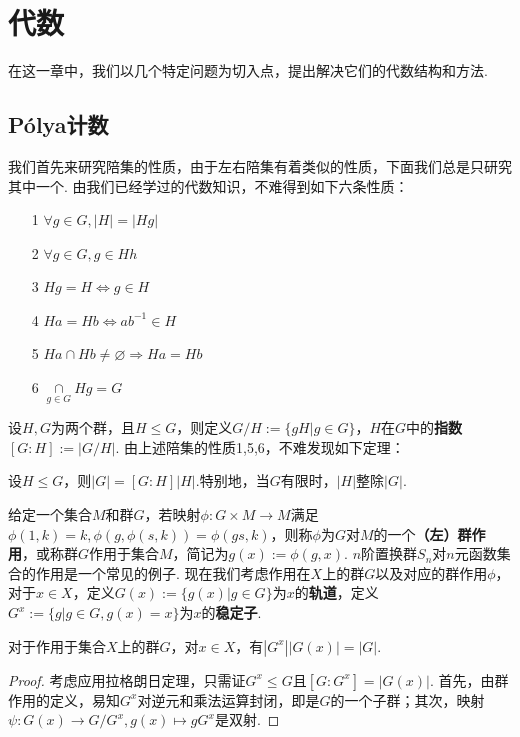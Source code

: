 \section{代数}
在这一章中，我们以几个特定问题为切入点，提出解决它们的代数结构和方法.

\subsection{Pólya计数}
我们首先来研究陪集的性质，由于左右陪集有着类似的性质，下面我们总是只研究其中一个. 由我们已经学过的代数知识，不难得到如下六条性质：
\begin{itemize}
	\item[1] $\forall g\in G,|H|=|Hg|$
	\item[2] $\forall g\in G,g\in Hh$
	\item[3] $Hg=H\iff g\in H$
	\item[4] $Ha=Hb\iff ab^{-1}\in H$
	\item[5] $Ha\cap Hb\neq\varnothing\Rightarrow Ha=Hb$
	\item[6] $\mathop{\cap}\limits_{g\in G}Hg=G$
\end{itemize}

设$H,G$为两个群，且$H\leqslant G$，则定义$G/H:=\{gH|g\in G\}$，$H$在$G$中的\textbf{指数}$[G:H]:=|G/H|$. 由上述陪集的性质1,5,6，不难发现如下定理：
\begin{theorem}[拉格朗日定理]
	设$H\leqslant G$，则$|G|=[G:H]|H|$.特别地，当$G$有限时，$|H|$整除$|G|$.
\end{theorem}

给定一个集合$M$和群$G$，若映射$\phi:G\times M\rightarrow M$满足$\phi(1,k)=k,\phi(g,\phi(s,k))=\phi(gs,k)$，则称$\phi$为$G$对$M$的一个\textbf{（左）群作用}，或称群$G$作用于集合$M$，简记为$g(x):=\phi(g,x)$. $n$阶置换群$S_n$对$n$元函数集合的作用是一个常见的例子. 现在我们考虑作用在$X$上的群$G$以及对应的群作用$\phi$，对于$x\in X$，定义$G(x):=\{g(x)|g\in G\}$为$x$的\textbf{轨道}，定义$G^x:=\{g|g\in G,g(x)=x\}$为$x$的\textbf{稳定子}.

\begin{theorem}[轨道-稳定子定理]
	对于作用于集合$X$上的群$G$，对$x\in X$，有$|G^x||G(x)|=|G|$.
\end{theorem}
\begin{proof}
	考虑应用拉格朗日定理，只需证$G^x\leqslant G$且$[G:G^x]=|G(x)|$. 首先，由群作用的定义，易知$G^x$对逆元和乘法运算封闭，即是$G$的一个子群；其次，映射$\psi:G(x)\rightarrow G/G^x, g(x)\longmapsto gG^x$是双射.
\end{proof}

